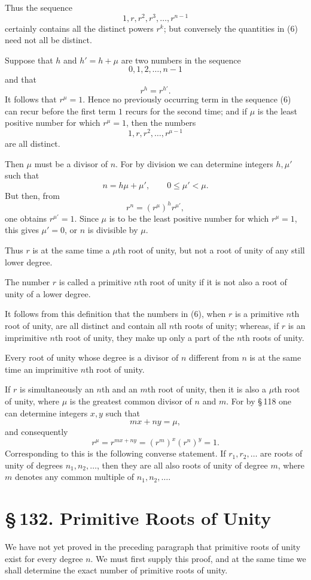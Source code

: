 \documentclass[11pt]{article}
\providecommand{\sect}[2]{\section*{\S\,#1. #2}}
\begin{document}
Thus the sequence
\[
\tag{6}        1,r,r^2,r^3,\ldots,r^{n-1}
\]
certainly contains all the distinct powers $r^k$; but conversely the quantities in (6) need not all be distinct.

Suppose that $h$ and $h'=h+\mu$ are two numbers in the sequence
\[
        0,1,2,\ldots,n-1
\]
and that
\[
        r^h=r^{h'}.
\]
It follows that $r^\mu=1$. Hence no previously occurring term in the sequence (6) can recur before the first term $1$ recurs for the second time; and if $\mu$ is the least positive number for which $r^\mu=1$, then the numbers
\[
\tag{7}        1,r,r^2,\ldots,r^{\mu-1}
\]
are all distinct.

Then $\mu$ must be a divisor of $n$. For by division we can determine integers $h,\mu'$ such that
\[
        n=h\mu+\mu',\qquad 0\le \mu'<\mu.
\]
But then, from
\[
        r^n=(r^\mu)^h r^{\mu'},
\]
one obtains $r^{\mu'}=1$. Since $\mu$ is to be the least positive number for which $r^\mu=1$, this gives $\mu'=0$, or $n$ is divisible by $\mu$.

Thus $r$ is at the same time a $\mu$th root of unity, but not a root of unity of any still lower degree.

The number $r$ is called a primitive $n$th root of unity if it is not also a root of unity of a lower degree.

It follows from this definition that the numbers in (6), when $r$ is a primitive $n$th root of unity, are all distinct and contain all $n$th roots of unity; whereas, if $r$ is an imprimitive $n$th root of unity, they make up only a part of the $n$th roots of unity.

Every root of unity whose degree is a divisor of $n$ different from $n$ is at the same time an imprimitive $n$th root of unity.

If $r$ is simultaneously an $n$th and an $m$th root of unity, then it is also a $\mu$th root of unity, where $\mu$ is the greatest common divisor of $n$ and $m$. For by \S\,118 one can determine integers $x,y$ such that
\[
        mx+ny=\mu,
\]
and consequently
\[
        r^\mu=r^{mx+ny}=(r^m)^x(r^n)^y=1.
\]
Corresponding to this is the following converse statement. If $r_1,r_2,\ldots$ are roots of unity of degrees $n_1,n_2,\ldots$, then they are all also roots of unity of degree $m$, where $m$ denotes any common multiple of $n_1,n_2,\ldots$.

\sect{132}{Primitive Roots of Unity}

We have not yet proved in the preceding paragraph that primitive roots of unity exist for every degree $n$. We must first supply this proof, and at the same time we shall determine the exact number of primitive roots of unity.
\end{document}
